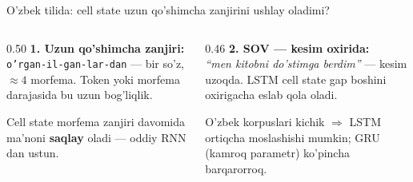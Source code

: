 \documentclass[aspectratio=169,11pt]{beamer}
\begin{document}
\begin{frame}{O'zbek tilida: cell state uzun qo'shimcha zanjirini ushlay oladimi?}
  \begin{columns}[T]
    \begin{column}{0.50\textwidth}
      \textbf{1. Uzun qo'shimcha zanjiri:}\\[3pt]
      \small
      \texttt{o'rgan-il-gan-lar-dan} --- bir so'z, $\approx 4$ morfema. Token yoki
      morfema darajasida bu uzun bog'liqlik.
      \begin{tcolorbox}[okbox,title=LSTM afzalligi,top=2pt,bottom=2pt]
        \footnotesize
        Cell state morfema zanjiri davomida ma'noni \textbf{saqlay} oladi ---
        oddiy RNN dan ustun.
      \end{tcolorbox}
    \end{column}
    \begin{column}{0.46\textwidth}
      \textbf{2. SOV --- kesim oxirida:}\\[3pt]
      \small
      \textit{``men kitobni do'stimga berdim''} --- kesim uzoqda. LSTM cell state
      gap boshini oxirigacha eslab qola oladi.\\[4pt]
      \begin{tcolorbox}[warnbox,title=Lekin,top=2pt,bottom=2pt]
        \footnotesize
        O'zbek korpuslari kichik $\Rightarrow$ LSTM ortiqcha moslashishi mumkin;
        GRU (kamroq parametr) ko'pincha barqarorroq.
      \end{tcolorbox}
    \end{column}
  \end{columns}
\end{frame}
\end{document}
